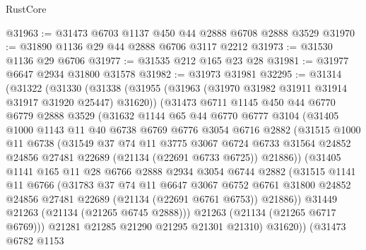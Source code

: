 \begin{lexlean}{RustCore}
\begin{coremodule}
@31963 := @31473 @6703 @1137 @450 @44 @2888 @6708 @2888 @3529
@31970 := @31890 @1136 @29 @44 @2888 @6706 @3117 @2212
@31973 := @31530 @1136 @29 @6706
@31977 := @31535 @212 @165 @23 @28
@31981 := @31977 @6647 @2934 @31800 @31578
@31982 := @31973 @31981
@32295 := @31314
    (@31322
      (@31330
        (@31338
          (@31955 (@31963 (@31970 @31982 @31911 @31914 @31917 @31920 @25447) @31620))
          (@31473
            @6711
            @1145
            @450
            @44
            @6770
            @6779
            @2888
            @3529
            (@31632
              @1144
              @65
              @44
              @6770
              @6777
              @3104
              (@31405
                @1000
                @1143
                @11
                @40
                @6738
                @6769
                @6776
                @3054
                @6716
                @2882
                (@31515
                  @1000
                  @11
                  @6738
                  (@31549
                    @37
                    @74
                    @11
                    @3775
                    @3067
                    @6724
                    @6733
                    @31564
                    @24852
                    @24856
                    @27481
                    @22689
                    (@21134 (@22691 @6733 @6725))
                    @21886))
                (@31405
                  @1141
                  @165
                  @11
                  @28
                  @6766
                  @2888
                  @2934
                  @3054
                  @6744
                  @2882
                  (@31515
                    @1141
                    @11
                    @6766
                    (@31783
                      @37
                      @74
                      @11
                      @6647
                      @3067
                      @6752
                      @6761
                      @31800
                      @24852
                      @24856
                      @27481
                      @22689
                      (@21134 (@22691 @6761 @6753))
                      @21886))
                  @31449
                  @21263
                  (@21134 (@21265 @6745 @2888)))
                @21263
                (@21134 (@21265 @6717 @6769)))
              @21281
              @21285
              @21290
              @21295
              @21301
              @21310)
            @31620))
        (@31473
          @6782
          @1153

\end{coremodule}
\end{lexlean}
